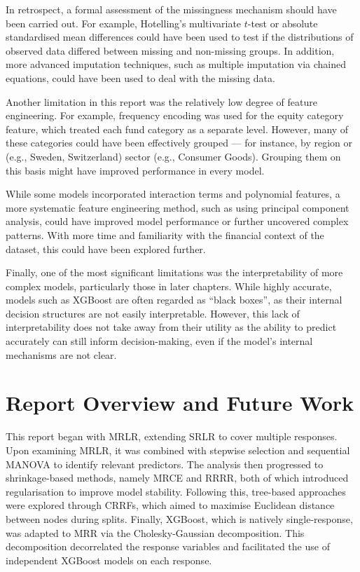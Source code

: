 \documentclass[11pt]{report} %
\begin{document}
In retrospect, a formal assessment of the missingness mechanism should have been carried out. For example, Hotelling’s multivariate $t$-test or absolute standardised mean differences could have been used to test if the distributions of observed data differed between missing and non-missing groups. In addition, more advanced imputation techniques, such as multiple imputation via chained equations, could have been used to deal with the missing data.

Another limitation in this report was the relatively low degree of feature engineering. For example, frequency encoding was used for the equity category feature, which treated each fund category as a separate level. However, many of these categories could have been effectively grouped — for instance, by region or (e.g., Sweden, Switzerland) sector (e.g., Consumer Goods). Grouping them on this basis might have improved performance in every model.

While some models incorporated interaction terms and polynomial features, a more systematic feature engineering method, such as using principal component analysis, could have improved model performance or further uncovered complex patterns. With more time and familiarity with the financial context of the dataset, this could have been explored further.

Finally, one of the most significant limitations was the interpretability of more complex models, particularly those in later chapters. While highly accurate, models such as XGBoost are often regarded as “black boxes”, as their internal decision structures are not easily interpretable.\cite{jackson2018multivariate} However, this lack of interpretability does not take away from their utility as the ability to predict accurately can still inform decision-making, even if the model's internal mechanisms are not clear.

\section{Report Overview and Future Work}
This report began with MRLR, extending SRLR to cover multiple responses. Upon examining MRLR, it was combined with stepwise selection and sequential MANOVA to identify relevant predictors. The analysis then progressed to shrinkage-based methods, namely MRCE and RRRR, both of which introduced regularisation to improve model stability. Following this, tree-based approaches were explored through CRRFs, which aimed to maximise Euclidean distance between nodes during splits. Finally, XGBoost, which is natively single-response, was adapted to MRR via the Cholesky-Gaussian decomposition. This decomposition decorrelated the response variables and facilitated the use of independent XGBoost models on each response.
\end{document}
